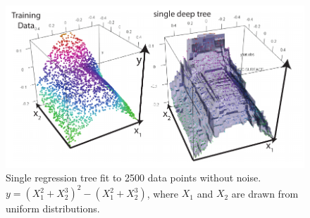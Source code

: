 \begin{figure}[!htbp]
\includegraphics[width=\textwidth,height=\textheight,keepaspectratio]{graphics/decisionTreeFit.pdf}
\caption{Single regression tree fit to 2500 data points without noise. $y=(X_1^2 + X_2^3)^2 - (X_1^2 + X_2^3)$, where $X_1$ and $X_2$ are drawn from uniform distributions.}
\label{decisionTreeFit}
\end{figure}

